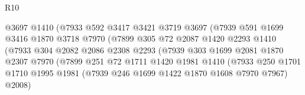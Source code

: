 \begin{lexlean}{R10}
\begin{coremodule}
                                      @3697
                                      @1410
                                      (@7933
                                        @592
                                        @3417
                                        @3421
                                        @3719
                                        @3697
                                        (@7939
                                          @591
                                          @1699
                                          @3416
                                          @1870
                                          @3718
                                          @7970
                                          (@7899
                                            @305
                                            @72
                                            @2087
                                            @1420
                                            @2293
                                            @1410
                                            (@7933
                                              @304
                                              @2082
                                              @2086
                                              @2308
                                              @2293
                                              (@7939
                                                @303
                                                @1699
                                                @2081
                                                @1870
                                                @2307
                                                @7970
                                                (@7899
                                                  @251
                                                  @72
                                                  @1711
                                                  @1420
                                                  @1981
                                                  @1410
                                                  (@7933
                                                    @250
                                                    @1701
                                                    @1710
                                                    @1995
                                                    @1981
                                                    (@7939 @246 @1699 @1422 @1870 @1608 @7970 @7967)
                                                    @2008)

\end{coremodule}
\end{lexlean}
